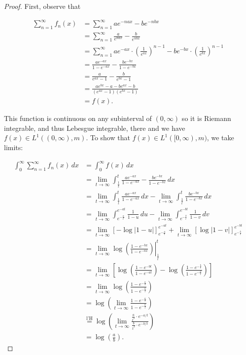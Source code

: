 \documentclass[11pt,oneside,english]{amsart}
\theoremstyle{definition}
\newcommand{\lom}[2]{\lim_{{#1}\rightarrow{#2}}}
\begin{document}
\begin{enumerate}
\begin{enumerate}
\begin{proof}
First, observe that

\begin{align*}
\sum_{n=1}^\infty f_n(x)&=\sum_{n=1}^\infty ae^{-nax}-be^{-nbx}\\[2mm]
&=\sum_{n=1}^\infty\frac{a}{e^{nax}}-\frac{b}{e^{nbx}}\\[2mm]
&=\sum_{n=1}^\infty ae^{-ax}\cdot\left(\frac{1}{e^{ax}}\right)^{n-1}-be^{-bx}\cdot\left(\frac{1}{e^{bx}}\right)^{n-1}\\[2mm]
&=\frac{ae^{-ax}}{1-e^{-ax}}-\frac{be^{-bx}}{1-e^{-bx}}\\[2mm]
&=\frac{a}{e^{ax}-1}-\frac{b}{e^{bx}-1}\\[2mm]
&=\frac{ae^{bx}-a-be^{ax}-b}{(e^{ax}-1)(e^{bx}-1)}\\[2mm]
&=f(x).
\end{align*}

This function is continuous on any subinterval of $(0,\infty)$ so it is Riemann integrable, and thus Lebesgue integrable, there and we have $f(x)\in L^1((0,\infty),m)$. To show that $f(x)\in L^1([0,\infty),m)$, we take limits:

\begin{align*}
\int_0^\infty\sum_{n=1}^\infty f_n(x)\,dx&=\int_0^\infty f(x)\,dx\\[2mm]
&=\lim_{t\rightarrow \infty}\int_{\frac{1}{t}}^t\frac{ae^{-ax}}{1-e^{-ax}}-\frac{be^{-bx}}{1-e^{-bx}}\,dx\\[2mm]
&=\lim_{t\rightarrow \infty}\int_{\frac{1}{t}}^t\frac{ae^{-ax}}{1-e^{-ax}}\,dx-\lim_{t\rightarrow \infty}\int_{\frac{1}{t}}^t\frac{be^{-bx}}{1-e^{-bx}}\,dx\\[2mm]
&=\lim_{t\rightarrow \infty}\int_{e^{-\frac{a}{t}}}^{e^{-at}}\frac{1}{1-u}\,du-\lim_{t\rightarrow \infty}\int_{e^{-\frac{b}{t}}}^{e^{-bt}}\frac{1}{1-v}\,dv\\[2mm]
&=\lim_{t\rightarrow \infty}\left[-\log|1-u|\right]_{e^{-\frac{a}{t}}}^{e^{-at}}+\lim_{t\rightarrow \infty}\left[\log|1-v|\right]_{e^{-\frac{b}{t}}}^{e^{-bt}}\\[2mm]
&=\lom{t}{\infty}\left.\log\left(\frac{1-e^{-bx}}{1-e^{-ax}}\right)\right|_{\frac{1}{t}}^t\\[2mm]
&=\lom{t}{\infty}\left[\log\left(\frac{1-e^{-bt}}{1-e^{-at}}\right)-\log\left(\frac{1-e^{-\frac{b}{t}}}{1-e^{-\frac{a}{t}}}\right)\right]\\[2mm]
&=\lom{t}{\infty}\log\left(\frac{1-e^{-\frac{a}{t}}}{1-e^{-\frac{b}{t}}}\right)\\[2mm]
&=\log\left(\lom{t}{\infty}\frac{1-e^{-\frac{a}{t}}}{1-e^{-\frac{b}{t}}}\right)\\[2mm]
&\stackrel{\text{l'H}}{=}\log\left(\lom{t}{\infty}\frac{\frac{a}{t^2}\cdot e^{-a/t}}{\frac{b}{t^2}\cdot e^{-b/t}}\right)\\[2mm]
&=\log\left(\frac{a}{b}\right).
\end{align*}


\end{proof}
\end{enumerate}
\end{enumerate}
\end{document}
